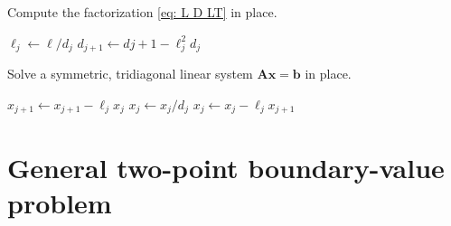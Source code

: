 \begin{algorithm}
\caption{Compute the factorization \eqref{eq: L D LT} in place.}
\label{alg: LDLT in place}
\begin{algorithmic}
\Statex
{}
\State $\ell_j\gets\ell/d_j$
\State $d_{j+1}\gets d{j+1}-\ell_j^2d_j$
\EndFor
\EndFunction
\end{algorithmic}
\end{algorithm}

\begin{algorithm}
\caption{Solve a symmetric, tridiagonal linear system 
$\boldsymbol{A}\boldsymbol{x}=\boldsymbol{b}$ in place.}
\label{alg: solve symmetric tridiagonal in place}
\begin{algorithmic}
\Statex
{}
    \State $x_{j+1}\gets x_{j+1}-\ell_jx_j$
\EndFor
{}
    \State $x_j\gets x_j/d_j$
\EndFor
{}
    \State $x_j\gets x_j-\ell_jx_{j+1}$
\EndFor
\EndFunction
\end{algorithmic}
\end{algorithm}

\section{General two-point boundary-value problem}

